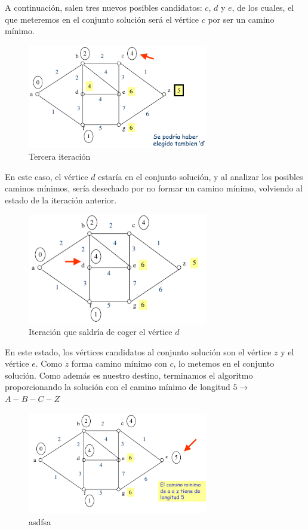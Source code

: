\documentclass[10pt,a4paper,spanish]{report}
\theoremstyle{definition}
\theoremstyle{remark}
\begin{document}
\begin{center}
\newpage

A continuación, salen tres nuevos posibles candidatos: $c$, $d$ y $e$, de los cuales, el que meteremos en el conjunto solución será el vértice $c$ por ser un camino mínimo.

\begin{figure}[!h]
\centering
\includegraphics[width=0.7\textwidth]{d4}
\caption{Tercera iteración}
\end{figure}

En este caso, el vértice $d$ estaría en el conjunto solución, y al analizar los posibles caminos mínimos, sería desechado por no formar un camino mínimo, volviendo al estado de la iteración anterior.

\begin{figure}[!h]
\centering
\includegraphics[width=0.7\textwidth]{d5}
\caption{Iteración que saldría de coger el vértice $d$}
\end{figure}

En este estado, los vértices candidatos al conjunto solución son el vértice $z$ y el vértice $e$. Como $z$ forma camino mínimo con $c$, lo metemos en el conjunto solución. Como además es nuestro destino, terminamos el algoritmo proporcionando la solución con el camino mínimo de longitud $5 \rightarrow $ $A-B-C-Z$

\begin{figure}[!h]
\centering
\includegraphics[width=0.7\textwidth]{d6}
\caption{asdfsa}
\end{figure}

\end{center}
\end{document}
